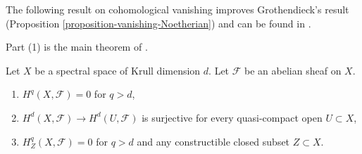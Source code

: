 \noindent
The following result on cohomological vanishing
improves Grothendieck's result
(Proposition \ref{proposition-vanishing-Noetherian})
and can be found in \cite{Scheiderer}.

\begin{proposition}
\label{proposition-cohomological-dimension-spectral}
\begin{reference}
Part (1) is the main theorem of \cite{Scheiderer}.
\end{reference}
Let $X$ be a spectral space of Krull dimension $d$.
Let $\mathcal{F}$ be an abelian sheaf on $X$.
\begin{enumerate}
\item $H^q(X, \mathcal{F}) = 0$ for $q > d$,
\item $H^d(X, \mathcal{F}) \to H^d(U, \mathcal{F})$ is surjective
for every quasi-compact open $U \subset X$,
\item $H^q_Z(X, \mathcal{F}) = 0$ for $q > d$ and any constructible
closed subset $Z \subset X$.
\end{enumerate}
\end{proposition}

